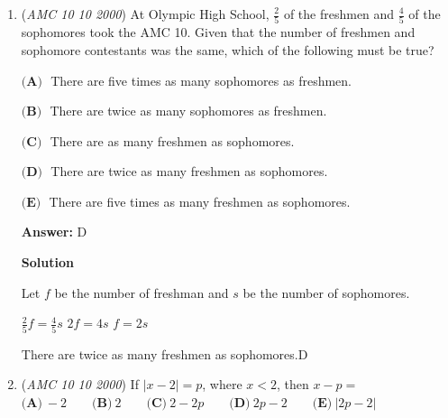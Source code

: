 \begin{enumerate}
$AD=1$.

 Since $\angle ADC$ is trisected, $\angle ADP= \angle PDB= \angle BDC=30^\circ$.

 Thus, $PD=\frac{2\sqrt{3}}{3}$
$DB=2$
$BP=\sqrt{3}-\frac{\sqrt{3}}{3}=\frac{2\sqrt{3}}{3}$.

 Adding, we get $\boxed{\textbf{(B) }  2+\frac{4\sqrt{3}}{3}}$.

 This is due to the fact that ABD and ABP are $30-60-90$ triangles

 -Amon26

 



\textbf{Solution 2}

After computing $\overline{BP} = \frac{2\sqrt{3}}{3},$ observe that triangle $\triangle BPD$ is isosceles with $\angle DPB = \angle BPD.$ Therefore, using $120 - 30 - 30$ triangle properties, we see that the perimeter is just $(2+ \sqrt{3}) \cdot \frac{2\sqrt{3}}{3} = \boxed{\textbf{(B) }  2+\frac{4\sqrt{3}}{3}}.$



	\item (\textit{AMC 10 10 2000}) At Olympic High School, $\frac{2}{5}$ of the freshmen and $\frac{4}{5}$ of the sophomores took the AMC 10. Given that the number of freshmen and sophomore contestants was the same, which of the following must be true? 


 $\textbf{(A) }$ There are five times as many sophomores as freshmen. 


 $\textbf{(B) }$ There are twice as many sophomores as freshmen.


 $\textbf{(C) }$ There are as many freshmen as sophomores.


 $\textbf{(D) }$ There are twice as many freshmen as sophomores. 


 $\textbf{(E) }$ There are five times as many freshmen as sophomores.


 
 \textbf{Answer: }D



\textbf{Solution}

Let $f$ be the number of freshman and $s$ be the number of sophomores.

 $\frac{2}{5}f=\frac{4}{5}s$
$2f = 4s$
$f=2s$

 There are twice as many freshmen as sophomores.$\boxed{\text{D}}$



	\item (\textit{AMC 10 10 2000}) If $|x-2|=p$, where $x<2$, then $x-p=$
$\textbf{(A)}\ -2 \qquad\textbf{(B)}\ 2 \qquad\textbf{(C)}\ 2-2p \qquad\textbf{(D)}\ 2p-2 \qquad\textbf{(E)}\ |2p-2|$


\end{enumerate}
